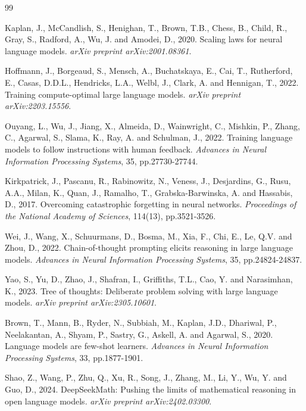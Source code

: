 \begin{thebibliography}{99}

Kaplan, J., McCandlish, S., Henighan, T., Brown, T.B., Chess, B., Child, R., Gray, S., Radford, A., Wu, J. and Amodei, D., 2020. Scaling laws for neural language models. \textit{arXiv preprint arXiv:2001.08361}.

Hoffmann, J., Borgeaud, S., Mensch, A., Buchatskaya, E., Cai, T., Rutherford, E., Casas, D.D.L., Hendricks, L.A., Welbl, J., Clark, A. and Hennigan, T., 2022. Training compute-optimal large language models. \textit{arXiv preprint arXiv:2203.15556}.

Ouyang, L., Wu, J., Jiang, X., Almeida, D., Wainwright, C., Mishkin, P., Zhang, C., Agarwal, S., Slama, K., Ray, A. and Schulman, J., 2022. Training language models to follow instructions with human feedback. \textit{Advances in Neural Information Processing Systems}, 35, pp.27730-27744.

Kirkpatrick, J., Pascanu, R., Rabinowitz, N., Veness, J., Desjardins, G., Rusu, A.A., Milan, K., Quan, J., Ramalho, T., Grabska-Barwinska, A. and Hassabis, D., 2017. Overcoming catastrophic forgetting in neural networks. \textit{Proceedings of the National Academy of Sciences}, 114(13), pp.3521-3526.

Wei, J., Wang, X., Schuurmans, D., Bosma, M., Xia, F., Chi, E., Le, Q.V. and Zhou, D., 2022. Chain-of-thought prompting elicits reasoning in large language models. \textit{Advances in Neural Information Processing Systems}, 35, pp.24824-24837.

Yao, S., Yu, D., Zhao, J., Shafran, I., Griffiths, T.L., Cao, Y. and Narasimhan, K., 2023. Tree of thoughts: Deliberate problem solving with large language models. \textit{arXiv preprint arXiv:2305.10601}.

Brown, T., Mann, B., Ryder, N., Subbiah, M., Kaplan, J.D., Dhariwal, P., Neelakantan, A., Shyam, P., Sastry, G., Askell, A. and Agarwal, S., 2020. Language models are few-shot learners. \textit{Advances in Neural Information Processing Systems}, 33, pp.1877-1901.

Shao, Z., Wang, P., Zhu, Q., Xu, R., Song, J., Zhang, M., Li, Y., Wu, Y. and Guo, D., 2024. DeepSeekMath: Pushing the limits of mathematical reasoning in open language models. \textit{arXiv preprint arXiv:2402.03300}.


\end{thebibliography}
